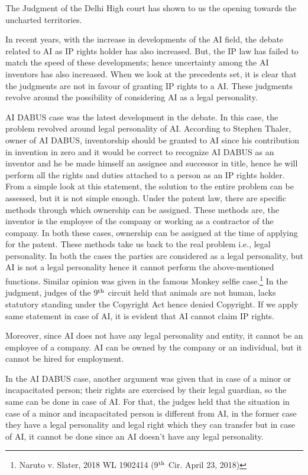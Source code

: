 \begin{multicols}{2}
\noi
The Judgment of the Delhi High court has shown to us the opening towards the uncharted
territories. 


\noi
In recent years, with the increase in developments of the AI field, the debate related to AI as
IP rights holder has also increased. But, the IP law has failed to match the speed of these
developments; hence uncertainty among the AI inventors has also increased. When we look
at the precedents set, it is clear that the judgments are not in favour of granting IP rights to a
AI. These judgments revolve around the possibility of considering AI as a legal personality. 

\noi
AI DABUS case was the latest development in the debate. In this case, the problem revolved
around legal personality of AI. According to Stephen Thaler, owner of AI DABUS,
inventorship should be granted to AI since his contribution in invention in zero and it would
be correct to recognize AI DABUS as an inventor and he be made himself an assignee and
successor in title, hence he will perform all the rights and duties attached to a person as an IP
rights holder. From a simple look at this statement, the solution to the entire problem can be assessed, but it is not simple enough. Under the patent law, there are specific methods
through which ownership can be assigned. These methods are, the inventor is the employee
of the company or working as a contractor of the company. In both these cases, ownership
can be assigned at the time of applying for the patent. These methods take us back to the real
problem i.e., legal personality. In both the cases the parties are considered as a legal
personality, but AI is not a legal personality hence it cannot perform the above-mentioned
functions. Similar opinion was given in the famous Monkey selfie case.\footnote{Naruto v. Slater, 2018 WL 1902414 (9$^{\rm th}$ Cir. April 23, 2018)} In the judgment,
judges of the 9$^{\rm th}$ circuit held that animals are not human, lacks statutory standing under the
Copyright Act hence denied Copyright. If we apply same statement in case of AI, it is
evident that AI cannot claim IP rights.

\noi
Moreover, since AI does not have any legal personality and entity, it cannot be an employee
of a company. AI can be owned by the company or an individual, but it cannot be hired for
employment.

\noi
In the AI DABUS case, another argument was given that in case of a minor or incapacitated
person; their rights are exercised by their legal guardian, so the same can be done in case of
AI. For that, the judges held that the situation in case of a minor and incapacitated person is
different from AI, in the former case they have a legal personality and legal right which they
can transfer but in case of AI, it cannot be done since an AI doesn’t have any legal
personality.


\end{multicols}
